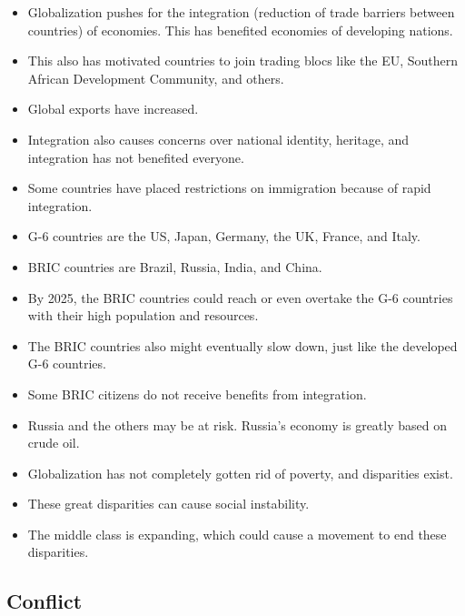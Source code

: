 \documentclass[11pt]{article}
\begin{document}
\begin{itemize}
\item Globalization pushes for the integration (reduction of trade barriers between countries) of economies. This has benefited economies of developing nations.
\item This also has motivated countries to join trading blocs like the EU, Southern African Development Community, and others.
\item Global exports have increased.
\item Integration also causes concerns over national identity, heritage, and integration has not benefited everyone.
\item Some countries have placed restrictions on immigration because of rapid integration.
\item G-6 countries are the US, Japan, Germany, the UK, France, and Italy.
\item BRIC countries are Brazil, Russia, India, and China.
\item By 2025, the BRIC countries could reach or even overtake the G-6 countries with their high population and resources.
\item The BRIC countries also might eventually slow down, just like the developed G-6 countries.
\item Some BRIC citizens do not receive benefits from integration.
\item Russia and the others may be at risk. Russia's economy is greatly based on crude oil.
\item Globalization has not completely gotten rid of poverty, and disparities exist.
\item These great disparities can cause social instability.
\item The middle class is expanding, which could cause a movement to end these disparities.
\end{itemize}
\subsection{Conflict}
\label{sec:orga11d0e9}
\end{document}
